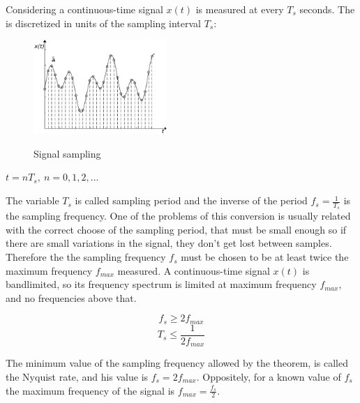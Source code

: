 Considering a continuous-time signal $x(t)$ is measured at every $T_{s}$ seconds. The is discretized in units of the sampling interval $T_{s}$:
\begin{figure}[]
    \centering
    \includegraphics[width=0.45\textwidth]{Chapters/2CHP/Diagrams/sampsignal.eps}
    \caption{Signal sampling}{}
    \label{fig:signalsamp}
\end{figure}
\begin{center}
    $t = nT_s,\> n = 0, 1, 2, ...$
\end{center}
The variable $T_s$ is called sampling period and the inverse of the period $f_s=\frac{1}{T_s}$ is the sampling frequency. One of the problems of this conversion is usually related with the correct choose of the sampling period, that must be small enough so if there are small variations in the signal, they don't get lost between samples. Therefore the the sampling frequency $f_s$ must be chosen to be at least twice the maximum frequency $f_{max}$ measured. A continuous-time signal $x(t)$ is bandlimited, so its frequency spectrum is limited at maximum frequency $f_{max}$, and no frequencies above that.

\begin{equation} \label{eq:sampFreq}
       f_s \geq 2f_{max}
\end{equation}
\begin{equation} \label{eq:sampPeriod}
    T_s \leq \frac{1}{2f_{max}}
\end{equation}

The minimum value of the sampling frequency allowed by the theorem, is called the Nyquist rate, and his value is $f_s = 2f_{max}$. Oppositely, for a known value of $f_s$ the maximum frequency of the signal is $f_{max}=\frac{f_s}{2}$.

